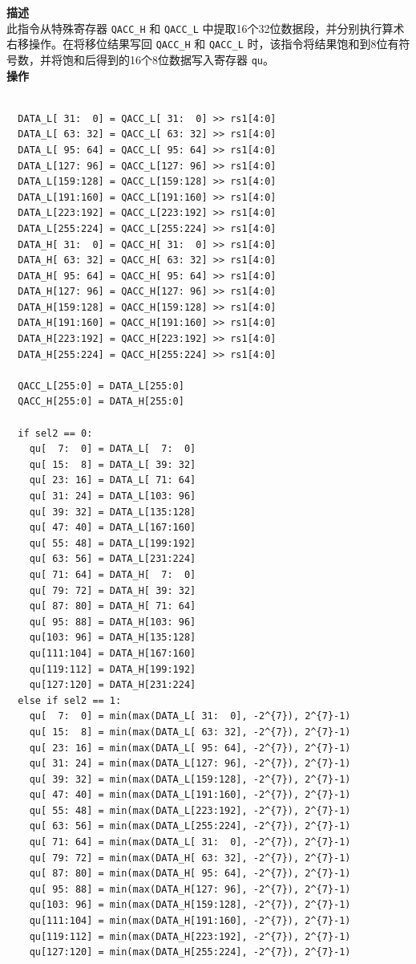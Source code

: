 \textbf{描述}\\
此指令从特殊寄存器 \lstinline{QACC_H} 和 \lstinline{QACC_L} 中提取16个32位数据段，并分别执行算术右移操作。在将移位结果写回 \lstinline{QACC_H} 和 \lstinline{QACC_L} 时，该指令将结果饱和到8位有符号数，并将饱和后得到的16个8位数据写入寄存器 \lstinline{qu}。\\
\textbf{操作}
\begin{lstlisting}

  DATA_L[ 31:  0] = QACC_L[ 31:  0] >> rs1[4:0]
  DATA_L[ 63: 32] = QACC_L[ 63: 32] >> rs1[4:0]
  DATA_L[ 95: 64] = QACC_L[ 95: 64] >> rs1[4:0]
  DATA_L[127: 96] = QACC_L[127: 96] >> rs1[4:0]
  DATA_L[159:128] = QACC_L[159:128] >> rs1[4:0]
  DATA_L[191:160] = QACC_L[191:160] >> rs1[4:0]
  DATA_L[223:192] = QACC_L[223:192] >> rs1[4:0]
  DATA_L[255:224] = QACC_L[255:224] >> rs1[4:0]
  DATA_H[ 31:  0] = QACC_H[ 31:  0] >> rs1[4:0]
  DATA_H[ 63: 32] = QACC_H[ 63: 32] >> rs1[4:0]
  DATA_H[ 95: 64] = QACC_H[ 95: 64] >> rs1[4:0]
  DATA_H[127: 96] = QACC_H[127: 96] >> rs1[4:0]
  DATA_H[159:128] = QACC_H[159:128] >> rs1[4:0]
  DATA_H[191:160] = QACC_H[191:160] >> rs1[4:0]
  DATA_H[223:192] = QACC_H[223:192] >> rs1[4:0]
  DATA_H[255:224] = QACC_H[255:224] >> rs1[4:0]

  QACC_L[255:0] = DATA_L[255:0]
  QACC_H[255:0] = DATA_H[255:0]

  if sel2 == 0:
    qu[  7:  0] = DATA_L[  7:  0]
    qu[ 15:  8] = DATA_L[ 39: 32]
    qu[ 23: 16] = DATA_L[ 71: 64]
    qu[ 31: 24] = DATA_L[103: 96]
    qu[ 39: 32] = DATA_L[135:128]
    qu[ 47: 40] = DATA_L[167:160]
    qu[ 55: 48] = DATA_L[199:192]
    qu[ 63: 56] = DATA_L[231:224]
    qu[ 71: 64] = DATA_H[  7:  0]
    qu[ 79: 72] = DATA_H[ 39: 32]
    qu[ 87: 80] = DATA_H[ 71: 64]
    qu[ 95: 88] = DATA_H[103: 96]
    qu[103: 96] = DATA_H[135:128]
    qu[111:104] = DATA_H[167:160]
    qu[119:112] = DATA_H[199:192]
    qu[127:120] = DATA_H[231:224]
  else if sel2 == 1:
    qu[  7:  0] = min(max(DATA_L[ 31:  0], -2^{7}), 2^{7}-1)
    qu[ 15:  8] = min(max(DATA_L[ 63: 32], -2^{7}), 2^{7}-1)
    qu[ 23: 16] = min(max(DATA_L[ 95: 64], -2^{7}), 2^{7}-1)
    qu[ 31: 24] = min(max(DATA_L[127: 96], -2^{7}), 2^{7}-1)
    qu[ 39: 32] = min(max(DATA_L[159:128], -2^{7}), 2^{7}-1)
    qu[ 47: 40] = min(max(DATA_L[191:160], -2^{7}), 2^{7}-1)
    qu[ 55: 48] = min(max(DATA_L[223:192], -2^{7}), 2^{7}-1)
    qu[ 63: 56] = min(max(DATA_L[255:224], -2^{7}), 2^{7}-1)
    qu[ 71: 64] = min(max(DATA_L[ 31:  0], -2^{7}), 2^{7}-1)
    qu[ 79: 72] = min(max(DATA_H[ 63: 32], -2^{7}), 2^{7}-1)
    qu[ 87: 80] = min(max(DATA_H[ 95: 64], -2^{7}), 2^{7}-1)
    qu[ 95: 88] = min(max(DATA_H[127: 96], -2^{7}), 2^{7}-1)
    qu[103: 96] = min(max(DATA_H[159:128], -2^{7}), 2^{7}-1)
    qu[111:104] = min(max(DATA_H[191:160], -2^{7}), 2^{7}-1)
    qu[119:112] = min(max(DATA_H[223:192], -2^{7}), 2^{7}-1)
    qu[127:120] = min(max(DATA_H[255:224], -2^{7}), 2^{7}-1)

\end{lstlisting}

